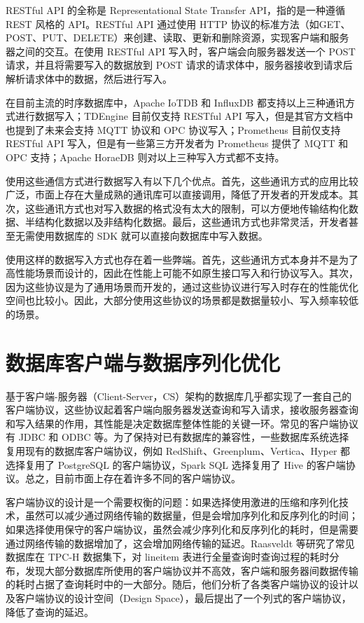 RESTful API 的全称是 Representational State Transfer API，指的是一种遵循 REST 风格的 API。RESTful API 通过使用 HTTP 协议的标准方法（如GET、POST、PUT、DELETE）来创建、读取、更新和删除资源，实现客户端和服务器之间的交互。在使用 RESTful API 写入时，客户端会向服务器发送一个 POST 请求，并且将需要写入的数据放到 POST 请求的请求体中，服务器接收到请求后解析请求体中的数据，然后进行写入。

在目前主流的时序数据库中，Apache IoTDB 和 InfluxDB 都支持以上三种通讯方式进行数据写入；TDEngine 目前仅支持 RESTful API 写入，但是其官方文档中也提到了未来会支持 MQTT 协议和 OPC 协议写入；Prometheus 目前仅支持 RESTful API 写入，但是有一些第三方开发者为 Prometheus 提供了 MQTT 和 OPC 支持；Apache HoraeDB 则对以上三种写入方式都不支持。

使用这些通信方式进行数据写入有以下几个优点。首先，这些通讯方式的应用比较广泛，市面上存在大量成熟的通讯库可以直接调用，降低了开发者的开发成本。其次，这些通讯方式也对写入数据的格式没有太大的限制，可以方便地传输结构化数据、半结构化数据以及非结构化数据。最后，这些通讯方式也非常灵活，开发者甚至无需使用数据库的 SDK 就可以直接向数据库中写入数据。

使用这样的数据写入方式也存在着一些弊端。首先，这些通讯方式本身并不是为了高性能场景而设计的，因此在性能上可能不如原生接口写入和行协议写入。其次，因为这些协议是为了通用场景而开发的，通过这些协议进行写入时存在的性能优化空间也比较小。因此，大部分使用这些协议的场景都是数据量较小、写入频率较低的场景。


\section{数据库客户端与数据序列化优化\label{sec:chap2-sec3}}
基于客户端-服务器（Client-Server，CS）架构的数据库几乎都实现了一套自己的客户端协议，这些协议起着客户端向服务器发送查询和写入请求，接收服务器查询和写入结果的作用，其性能是决定数据库整体性能的关键一环。常见的客户端协议有 JDBC\cite{zukowski2006jdbc} 和 ODBC\cite{geiger1995inside} 等。为了保持对已有数据库的兼容性，一些数据库系统选择复用现有的数据库客户端协议，例如 RedShift\cite{gupta2015amazon}、Greenplum\cite{lyu2021greenplum}、Vertica\cite{lamb2012vertica}、Hyper\cite{neumann2011efficiently} 都选择复用了 PostgreSQL 的客户端协议，Spark SQL\cite{armbrust2015spark} 选择复用了 Hive 的客户端协议。总之，目前市面上存在着许多不同的客户端协议。

客户端协议的设计是一个需要权衡的问题：如果选择使用激进的压缩和序列化技术，虽然可以减少通过网络传输的数据量，但是会增加序列化和反序列化的时间；如果选择使用保守的客户端协议，虽然会减少序列化和反序列化的耗时，但是需要通过网络传输的数据增加了，这会增加网络传输的延迟。Raasveldt 等研究了常见数据库在 TPC-H 数据集\cite{poess2000new}下，对 lineitem 表进行全量查询时查询过程的耗时分布，发现大部分数据库所使用的客户端协议并不高效，客户端和服务器间数据传输的耗时占据了查询耗时中的一大部分。随后，他们分析了各类客户端协议的设计以及客户端协议的设计空间（Design Space），最后提出了一个列式的客户端协议，降低了查询的延迟\cite{raasveldt2017don}。

